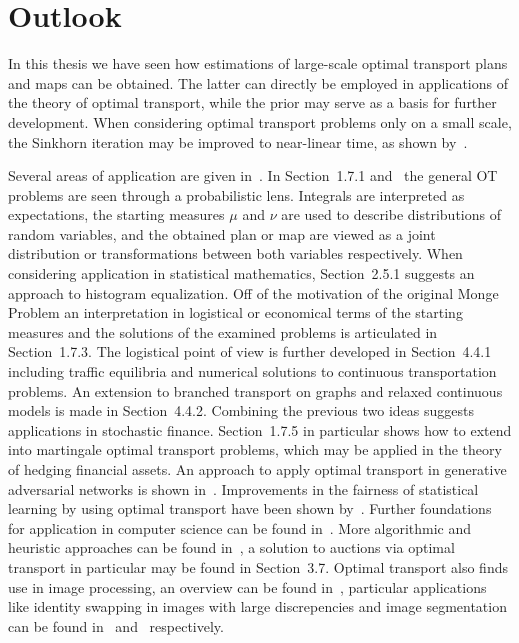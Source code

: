 \chapter*{Outlook}

In this thesis we have seen how estimations of large-scale optimal transport plans and maps can be obtained. The latter can directly be employed in applications of the theory of optimal transport, while the prior may serve as a basis for further development. When considering optimal transport problems only on a small scale, the Sinkhorn iteration may be improved to near-linear time, as shown by~\cite{Alts2019}.

Several areas of application are given in~\cite{San2015}. In Section~1.7.1 and\ \cite{Seg2018} the general OT problems are seen through a probabilistic lens. Integrals are interpreted as expectations, the starting measures $\mu$ and $\nu$ are used to describe distributions of random variables, and the obtained plan or map are viewed as a joint distribution or transformations between both variables respectively. When considering application in statistical mathematics, Section~2.5.1 suggests an approach to histogram equalization. Off of the motivation of the original Monge Problem an interpretation in logistical or economical terms of the starting measures and the solutions of the examined problems is articulated in Section~1.7.3. The logistical point of view is further developed in Section~4.4.1 including traffic equilibria and numerical solutions to continuous transportation problems. An extension to branched transport on graphs and relaxed continuous models is made in Section~4.4.2. Combining the previous two ideas suggests applications in stochastic finance. Section~1.7.5 in particular shows how to extend into martingale optimal transport problems, which may be applied in the theory of hedging financial assets. An approach to apply optimal transport in generative adversarial networks is shown in~\cite{Sal2018}. Improvements in the fairness of statistical learning by using optimal transport have been shown by~\cite{Barr2018}. Further foundations for application in computer science can be found in~\cite{Levy2017}. More algorithmic and heuristic approaches can be found in~\cite{Pey2019}, a solution to auctions via optimal transport in particular may be found in Section~3.7. Optimal transport also finds use in image processing, an overview can be found in~\cite{Papa2015}, particular applications like identity swapping in images with large discrepencies and image segmentation can be found in~\cite{Zhu2020} and~\cite{Rabin2015} respectively.

